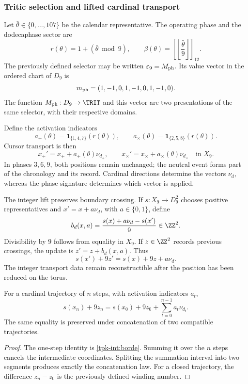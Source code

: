 \subsubsection{Tritic selection and lifted cardinal transport}
\label{tpk-int:seleccion}

Let \(\bar\theta\in\{0,\ldots,107\}\) be the calendar representative.
The operating phase and the dodecaphase sector are
\begin{equation}
 r(\theta)=1+(\bar\theta\bmod9),\qquad
 \beta(\theta)=\left[\left\lfloor\frac{\bar\theta}{9}\right\rfloor\right]_{12}.
 \label{tpk-int:fase}
\end{equation}
The previously defined selector may be written \(\varepsilon_9=M_{\rm ph}\).
Its value vector in the ordered chart of \(D_9\) is
\[
 m_{\rm ph}=(1,-1,0,1,-1,0,1,-1,0).
\]
The function \(M_{\rm ph}:D_9\to\TRIT\) and this vector are two
presentations of the same selector, with their respective domains.

Define the activation indicators
\[
 a_+(\theta)=\mathbf1_{\{1,4,7\}}(r(\theta)),\qquad
 a_\times(\theta)=\mathbf1_{\{2,5,8\}}(r(\theta)).
\]
Cursor transport is then
\begin{equation}
 x_+'=x_++a_+(\theta)\nu_{d_+},\qquad
 x_\times'=x_\times+a_\times(\theta)\nu_{d_\times}
 \quad\text{in }X_9.
 \label{tpk-int:cursores}
\end{equation}
In phases \(3,6,9\), both positions remain unchanged; the neutral event
forms part of the chronology and its record. Cardinal directions determine
the vectors \(\nu_d\), whereas the phase signature determines which
vector is applied.

The integer lift preserves boundary crossing. If
\(s:X_9\to D_9^2\) chooses positive representatives and
\(x'=x+a\nu_d\), with \(a\in\{0,1\}\), define
\begin{equation}
 b_d(x,a)=\frac{s(x)+a\nu_d-s(x')}{9}\in\ZZ^2.
 \label{tpk-int:borde}
\end{equation}
Divisibility by \(9\) follows from equality in \(X_9\).
If \(z\in\ZZ^2\) records previous crossings, the update is
\(z'=z+b_d(x,a)\). Thus
\[
 s(x')+9z'=s(x)+9z+a\nu_d.
\]
The integer transport data remain reconstructible after the position
has been reduced on the torus.

\begin{proposition}
\label{tpk-int:prop-desplazamiento}
For a cardinal trajectory of \(n\) steps, with activation indicators
\(a_t\),
\[
 s(x_n)+9z_n=s(x_0)+9z_0+
 \sum_{t=0}^{n-1}a_t\nu_{d_t}.
\]
The same equality is preserved under concatenation of two compatible trajectories.
\end{proposition}
\begin{proof}
The one-step identity is \eqref{tpk-int:borde}. Summing it over the
\(n\) steps cancels the intermediate coordinates. Splitting the summation
interval into two segments produces exactly the concatenation law.
For a closed trajectory, the difference \(z_n-z_0\) is the previously
defined winding number.
\end{proof}

